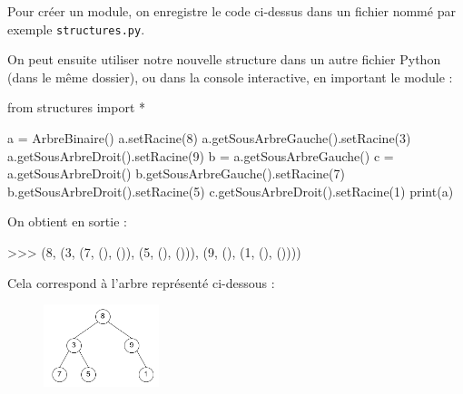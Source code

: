 \documentclass[
  letterpaper,
  DIV=11,
  numbers=noendperiod]{scrartcl}
\newenvironment{Shaded}{\begin{snugshade}}{\end{snugshade}}
\newcommand{\BuiltInTok}[1]{\textcolor[rgb]{0.00,0.23,0.31}{#1}}
\newcommand{\DecValTok}[1]{\textcolor[rgb]{0.68,0.00,0.00}{#1}}
\newcommand{\ImportTok}[1]{\textcolor[rgb]{0.00,0.46,0.62}{#1}}
\newcommand{\NormalTok}[1]{\textcolor[rgb]{0.00,0.23,0.31}{#1}}
\newcommand{\OperatorTok}[1]{\textcolor[rgb]{0.37,0.37,0.37}{#1}}
\begin{document}
Pour créer un module, on enregistre le code ci-dessus dans un fichier
nommé par exemple \texttt{structures.py}.

On peut ensuite utiliser notre nouvelle structure dans un autre fichier
Python (dans le même dossier), ou dans la console interactive, en
important le module :

\begin{Shaded}
\begin{Highlighting}[]
\ImportTok{from}\NormalTok{ structures }\ImportTok{import} \OperatorTok{*}

\NormalTok{a }\OperatorTok{=}\NormalTok{ ArbreBinaire()}
\NormalTok{a.setRacine(}\DecValTok{8}\NormalTok{)}
\NormalTok{a.getSousArbreGauche().setRacine(}\DecValTok{3}\NormalTok{)}
\NormalTok{a.getSousArbreDroit().setRacine(}\DecValTok{9}\NormalTok{)}
\NormalTok{b }\OperatorTok{=}\NormalTok{ a.getSousArbreGauche()}
\NormalTok{c }\OperatorTok{=}\NormalTok{ a.getSousArbreDroit()}
\NormalTok{b.getSousArbreGauche().setRacine(}\DecValTok{7}\NormalTok{)}
\NormalTok{b.getSousArbreDroit().setRacine(}\DecValTok{5}\NormalTok{)}
\NormalTok{c.getSousArbreDroit().setRacine(}\DecValTok{1}\NormalTok{)}
\BuiltInTok{print}\NormalTok{(a)}
\end{Highlighting}
\end{Shaded}

On obtient en sortie :

\begin{Shaded}
\begin{Highlighting}[]
\OperatorTok{\textgreater{}\textgreater{}\textgreater{}}\NormalTok{ (}\DecValTok{8}\NormalTok{, (}\DecValTok{3}\NormalTok{, (}\DecValTok{7}\NormalTok{, (), ()), (}\DecValTok{5}\NormalTok{, (), ())), (}\DecValTok{9}\NormalTok{, (), (}\DecValTok{1}\NormalTok{, (), ())))}
\end{Highlighting}
\end{Shaded}

Cela correspond à l'arbre représenté ci-dessous :

\begin{figure}

{\centering \includegraphics[width=0.3\textwidth,height=\textheight]{arbre_bin3.png}

}

\end{figure}
\end{document}
